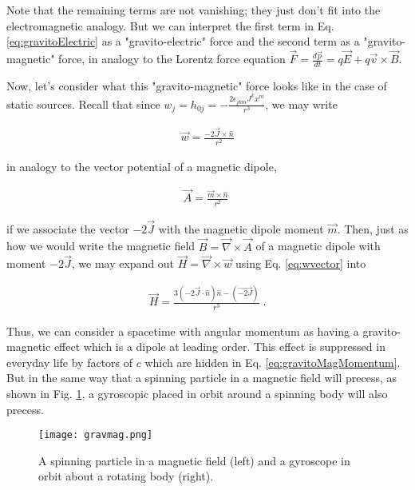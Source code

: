 \documentclass[10pt]{article}
\begin{document}
Note that the remaining terms are not vanishing; they just don't fit into the electromagnetic analogy. But we can interpret the first term in Eq. \ref{eq:gravitoElectric} as a "gravito-electric" force and the second term as a "gravito-magnetic" force, in analogy to the Lorentz force equation $\vec{F} = \frac{d\vec{p}}{dt} = q \vec{E} + q \vec{v} \times \vec{B}$.

Now, let's consider what this "gravito-magnetic" force looks like in the case of static sources. Recall that since $w_j = h_{0j} = -\frac{2 \epsilon_{jkm} J^k x^m}{r^3}$, we may write

\begin{align}\label{eq:wvector}
\vec{w} = \frac{-2\vec{J} \times \hat{n}}{r^2}
\end{align}

\noindent in analogy to the vector potential of a magnetic dipole,

\begin{align}\label{eq:magDipolePotential}
\vec{A} = \frac{\vec{m} \times \hat{n}}{r^2} \;
\end{align}

\noindent if we associate the vector $-2\vec{J}$ with the magnetic dipole moment $\vec{m}$. Then, just as how we would write the magnetic field $\vec{B}= \vec{\nabla} \times \vec{A} $ of a magnetic dipole with moment $-2\vec{J}$, we may expand out $\vec{H} = \vec{\nabla} \times \vec{w}$ using Eq. \ref{eq:wvector} into

\begin{align}\label{eq:gravitoMagMomentum}
\vec{H} = \frac{3(-2\vec{J} \cdot \hat{n}) \hat{n} - (\vec{-2J})}{r^3} \; .
\end{align}

Thus, we can consider a spacetime with angular momentum as having a gravito-magnetic effect which is a dipole at leading order. This effect is suppressed in everyday life by factors of $c$ which are hidden in Eq. \ref{eq:gravitoMagMomentum}. But in the same way that a spinning particle in a magnetic field will precess, as shown in Fig. \ref{fig:GravMag}, a gyroscopic placed in orbit around a spinning body will also precess.

\begin{figure}[h]
\centering
\texttt{[image: gravmag.png]}
\caption{A spinning particle in a magnetic field (left) and a gyroscope in orbit about a rotating body (right).}
\label{fig:GravMag}
\end{figure}
\end{document}
